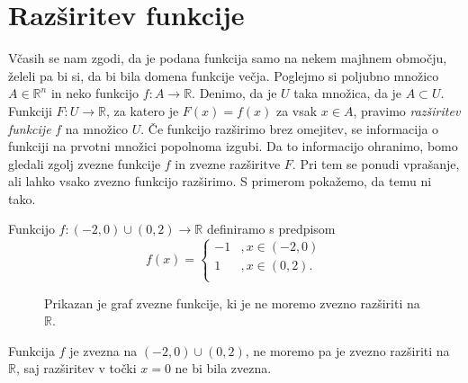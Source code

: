\documentclass[mat1]{fmfdelo}
\newcommand{\R}{\mathbb R}
\newcommand{\0}{\underline{0}}
\begin{document}
\section{Razširitev funkcije}\label{raz:siritev}
Včasih se nam zgodi, da je podana funkcija samo na nekem majhnem območju, želeli pa bi si, da bi bila domena funkcije večja. Poglejmo si poljubno množico $A \in \R^n$ in neko funkcijo $f : A \to \R$. Denimo, da je $U$ taka množica, da je $A \subset U$. Funkciji $F : U \to \R$, za katero je $F(x) = f(x)$ za vsak $x \in A$, pravimo \emph{razširitev funkcije} $f$ na množico $U$. Če funkcijo razširimo brez omejitev, se informacija o funkciji na prvotni množici popolnoma izgubi. Da to informacijo ohranimo, bomo gledali zgolj zvezne funkcije $f$ in zvezne razširitve $F$. Pri tem se ponudi vprašanje, ali lahko vsako zvezno funkcijo razširimo. S primerom pokažemo, da temu ni tako.

\begin{primer}
Funkcijo $f : (-2, 0) \cup (0, 2) \to \R$ definiramo s predpisom
\[  f(x) = \left \{
\begin{array}{ll}
	-1 &, x \in (-2, 0)\\
	1 &, x \in (0, 2). \\
\end{array} 
\right. \]

\begin{figure}[h!]
	\centering
	\caption{Prikazan je graf zvezne funkcije, ki je ne moremo zvezno razširiti na $\R$.}
\end{figure}

Funkcija $f$ je zvezna na $(-2, 0) \cup (0, 2)$, ne moremo pa je zvezno razširiti na $\R$, saj razširitev v točki $x = 0$ ne bi bila zvezna.
\end{primer}
\end{document}
